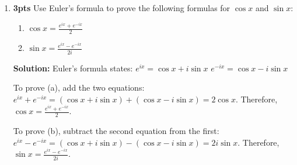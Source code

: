 \documentclass[nohyper,nobib,xcolor=dvipsnames,svgnames,x11names]{tufte-book}
\begin{document}
\begin{enumerate}
    $= 2^4(\cos(-2\pi)+i\sin(-2\pi)) = 16(1+0i)=16$.

    \item \textbf{3pts} Use Euler's formula to prove the following formulas for $\cos x$ and $\sin x$:
    \begin{enumerate}
        \item $\cos x = \frac{e^{ix}+e^{-ix}}{2}$
        \item $\sin x = \frac{e^{ix}-e^{-ix}}{2i}$
    \end{enumerate}
    \textbf{Solution:}
    Euler's formula states:
    $e^{ix} = \cos x + i\sin x$
    $e^{-ix} = \cos x - i\sin x$

    To prove (a), add the two equations:
    $e^{ix}+e^{-ix} = (\cos x + i\sin x) + (\cos x - i\sin x) = 2\cos x$.
    Therefore, $\cos x = \frac{e^{ix}+e^{-ix}}{2}$.

    To prove (b), subtract the second equation from the first:
    $e^{ix}-e^{-ix} = (\cos x + i\sin x) - (\cos x - i\sin x) = 2i\sin x$.
    Therefore, $\sin x = \frac{e^{ix}-e^{-ix}}{2i}$.

\end{enumerate}

\end{document}
